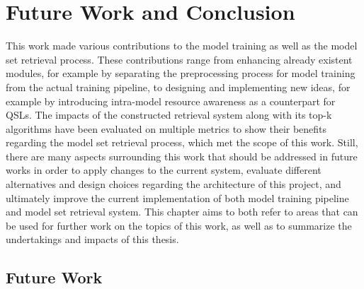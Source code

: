 \chapter{Future Work and Conclusion} \label{chap:conclusion}

This work made various contributions to the model training as well as the model set retrieval process. These contributions range from enhancing already existent modules, for example by separating the preprocessing process for model training from the actual training pipeline, to designing and implementing new ideas, for example by introducing intra-model resource awareness as a counterpart for QSLs. The impacts of the constructed retrieval system along with its top-k algorithms have been evaluated on multiple metrics to show their benefits regarding the model set retrieval process, which met the scope of this work. Still, there are many aspects surrounding this work that should be addressed in future works in order to apply changes to the current system, evaluate different alternatives and design choices regarding the architecture of this project, and ultimately improve the current implementation of both model training pipeline and model set retrieval system. This chapter aims to both refer to areas that can be used for further work on the topics of this work, as well as to summarize the undertakings and impacts of this thesis.

\section{Future Work}

